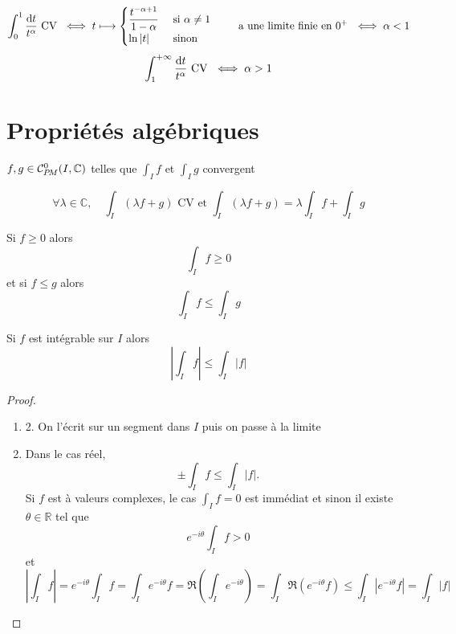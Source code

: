 \begin{ex}
    \[
        \int_0^1\frac{\mathrm{d} t}{t^\alpha}\text{ CV }\iff t\longmapsto \begin{cases}
            \dfrac{t^{-\alpha+1}}{1-\alpha} &\text{ si }\alpha\neq 1\\\ln|t|&\text{ sinon }
        \end{cases}
        \qquad \text{ a une limite finie en $0^+$ }
        \iff \alpha<1
    \]
    \[
        \int_1^{+\infty}\frac{\mathrm{d} t}{t^\alpha}\text{ CV }\iff \alpha>1
    \]
\end{ex}

\section{Propriétés algébriques}

\begin{prop}
    \Hyp $f,g\in\CPM(I, \mathbb C)$ telles que $\displaystyle \int_If$ et $\displaystyle \int_Ig$ convergent
    \begin{concenum}
    \item \[
            \forall \lambda\in\mathbb C, \quad \int_I(\lambda f+g)\text{ CV  et }\int_I(\lambda f+g)=\lambda\int_If+\int_Ig
        \]
    \item Si $f\geq 0$ alors \[
            \int_If\geq 0
        \]
        et si $f\leq g$ alors \[
            \int_If\leq \int_Ig
        \]
    \item Si $f$ est intégrable sur $I$ alors \[
            \left| \int_If \right|\leq \int_I|f|
        \]
    \end{concenum}
\end{prop}

\begin{proof}~
    \begin{enumerate}
        \item 2. On l'écrit sur un segment dans $I$ puis on passe à la limite
        \setcounter{enumi}{2}
        \item Dans le cas réel, \[
                \pm\int_If\leq \int_I|f|.
            \]
            Si $f$ est à valeurs complexes, le cas $\displaystyle\int_If=0$ est immédiat et sinon il existe $\theta\in\mathbb R$ tel que \[
                e^{-i\theta}\int_If>0
            \]
            et \[
                \left| \int_I f \right|=e^{-i\theta}\int_If=\int_Ie^{-i\theta}f=\Re \left( \int_Ie^{-i\theta} \right)=\int_I\Re(e^{-i\theta}f)\leq \int_I|e^{-i\theta}f|=\int_I|f|
            \]
    \end{enumerate}
\end{proof}


